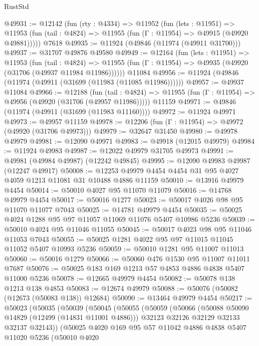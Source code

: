 \begin{lexlean}{RustStd}
\begin{coremodule}
@49931 := @12142
    (fun (rty : @4334) =>
    @11952
      (fun (lets : @11951) =>
      @11953 (fun (tail : @4824) => @11955 (fun (Γ : @11954) => @49915 (@49920 @49881)))))
    @7618
@49935 := @11924 (@49846 (@11974 (@49911 @31700)))
@49937 := @31707 @49876 @49580
@49949 := @12164
    (fun (lets : @11951) =>
    @11953
      (fun (tail : @4824) =>
      @11955 (fun (Γ : @11954) => @49935 (@49920 (@31706 (@49937 @11984 @11986))))))
    @11084
@49956 := @11924 (@49846 (@11974 (@49911 (@31699 (@11983 (@11085 @11986))))))
@49957 := @49937 @11084
@49966 := @12188
    (fun (tail : @4824) => @11955 (fun (Γ : @11954) => @49956 (@49920 (@31706 (@49957 @11986)))))
    @11159
@49971 := @49846 (@11974 (@49911 (@31699 (@11983 @11160))))
@49972 := @11924 @49971
@49973 := @49957 @11159
@49978 := @12206 (fun (Γ : @11954) => @49972 (@49920 (@31706 @49973)))
@49979 := @32647 @31450
@49980 := @49978 @49979
@49981 := @12090 @49971
@49983 := @49918 (@12015 @49979)
@49984 := @11924 @49983
@49987 := @12022 @49979 @31705 @49973
@49991 := @49981 (@49984 @49987) (@12242 @49845)
@49995 := @12090 @49983 @49987 (@12247 @49917)
@50008 := @12253 @49979 @4454 @4454 @31 @95 @4027 @4059 @1213 @11081 @31 @10488 @4886 @11159
@50010 := @13916 @49979 @4454
@50014 := @50010 @4027 @95 @11070 @11079
@50016 := @14768 @49979 @4454
@50017 := @50016 @1277
@50023 := @50017 @4026 @98 @95 @11070 @11077 @7043
@50025 := @14781 @49979 @4454
@50035 := @50025 @4024 @1288 @95 @97 @11057 @11069 @11076 @5407 @10986 @5236
@50039 := @50010 @4024 @95 @11046 @11055
@50045 := @50017 @4023 @98 @95 @11046 @11053 @7043
@50055 := @50025 @1281 @4022 @95 @97 @11015 @11045 @11052 @5407 @10993 @5236
@50059 := @50010 @1281 @95 @11007 @11013
@50060 := @50016 @1279
@50066 := @50060 @476 @1530 @95 @11007 @11011 @7687
@50076 := @50025 @183 @169 @1213 @57 @4853 @4886 @4838 @5407 @11000 @5236
@50078 := @12665 @49979 @4454
@50082 := @50078 @138 @1213 @138 @4853
@50083 := @12674 @49979
@50088 := @50076 (@50082 (@12673 (@50083 @138)) @12684)
@50090 := @13464 @49979 @4454
@50217 := @50023
    (@50035
      (@50039
        (@50045
          (@50055
            (@50059
              (@50066
                (@50088 @50090 @14829 (@12499 (@14831 @11001 @4886)))
                @32123
                @32126
                @32129
                @32133
                @32137
                @32143))
            (@50025
              @4020
              @169
              @95
              @57
              @11042
              @4886
              @4838
              @5407
              @11020
              @5236
              (@50010
                @4020

\end{coremodule}
\end{lexlean}

